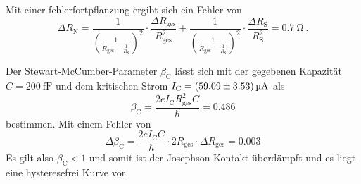 Mit einer fehlerfortpflanzung ergibt sich ein Fehler von
\begin{equation}
    \Delta R_\mathrm{N} = \frac{1}{\left( \frac{1}{R_{\mathrm{ges}} - \frac{1}{R_{\mathrm{S}}}} \right)^2 } \cdot \frac{\Delta R_{\mathrm{ges}}}{R_{\mathrm{ges}}^2} + \frac{1}{\left( \frac{1}{R_{\mathrm{ges}} - \frac{1}{R_{\mathrm{S}}}} \right)^2 } \cdot \frac{\Delta R_{\mathrm{S}}}{R_{\mathrm{S}}^2} = \SI{0.7}{\ohm}\:.
\end{equation}

Der Stewart-McCumber-Parameter $\beta_\mathrm{C}$ lässt sich mit der gegebenen Kapazität $C=\SI{200}{\femto\farad}$ und dem kritischen Strom $I_\mathrm{C} = \SI{59.09+-3.53}{\micro\ampere}$ als
\begin{equation}
    \beta_\mathrm{C} = \frac{2 e I_\mathrm{C} R_\mathrm{ges}^2 C}{\hbar} = 0.486
\end{equation}
bestimmen. 
Mit einem Fehler von
\begin{equation}
    \Delta \beta_\mathrm{C} = \frac{2 e I_\mathrm{C} C}{\hbar} \cdot 2 R_\mathrm{ges} \cdot \Delta R_\mathrm{ges} = 0.003
\end{equation}
Es gilt also $\beta_\mathrm{C} < 1$ und somit ist der Josephson-Kontakt überdämpft und es liegt eine hysteresefrei Kurve vor.